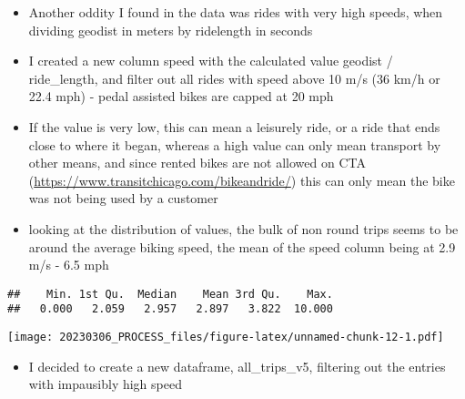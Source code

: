 \documentclass[
]{article}
\newenvironment{Shaded}{\begin{snugshade}}{\end{snugshade}}
\newcommand{\AttributeTok}[1]{\textcolor[rgb]{0.77,0.63,0.00}{#1}}
\newcommand{\DecValTok}[1]{\textcolor[rgb]{0.00,0.00,0.81}{#1}}
\newcommand{\FunctionTok}[1]{\textcolor[rgb]{0.00,0.00,0.00}{#1}}
\newcommand{\NormalTok}[1]{#1}
\newcommand{\OtherTok}[1]{\textcolor[rgb]{0.56,0.35,0.01}{#1}}
\newcommand{\SpecialCharTok}[1]{\textcolor[rgb]{0.00,0.00,0.00}{#1}}
\providecommand{\tightlist}{%
  \setlength{\itemsep}{0pt}\setlength{\parskip}{0pt}}
\begin{document}
\begin{itemize}
\tightlist
\item
  Another oddity I found in the data was rides with very high speeds,
  when dividing geodist in meters by ridelength in seconds
\item
  I created a new column speed with the calculated value geodist /
  ride\_length, and filter out all rides with speed above 10 m/s (36
  km/h or 22.4 mph) - pedal assisted bikes are capped at 20 mph
\item
  If the value is very low, this can mean a leisurely ride, or a ride
  that ends close to where it began, whereas a high value can only mean
  transport by other means, and since rented bikes are not allowed on
  CTA (\url{https://www.transitchicago.com/bikeandride/}) this can only
  mean the bike was not being used by a customer
\item
  looking at the distribution of values, the bulk of non round trips
  seems to be around the average biking speed, the mean of the speed
  column being at 2.9 m/s - 6.5 mph
\end{itemize}

\fontsize{9}{11}
\selectfont

\begin{Shaded}
\end{Shaded}

\begin{verbatim}
##    Min. 1st Qu.  Median    Mean 3rd Qu.    Max. 
##   0.000   2.059   2.957   2.897   3.822  10.000
\end{verbatim}

\begin{Shaded}
\end{Shaded}

\texttt{[image: 20230306\_PROCESS\_files/figure-latex/unnamed-chunk-12-1.pdf]}
\fontsize{10}{12} \selectfont

\begin{itemize}
\tightlist
\item
  I decided to create a new dataframe, all\_trips\_v5, filtering out the
  entries with impausibly high speed
\end{itemize}
\end{document}
